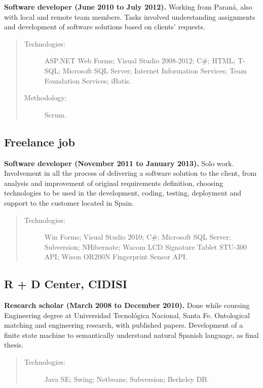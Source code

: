 \textbf{Software developer (June 2010 to July 2012).} Working from Paraná, also with local and remote team members. Tasks involved understanding assignments and development of software solutions based on clients' requests.

\begin{quote}
\begin{description}
    \item[Technologies:] ASP.NET Web Forms; Visual Studio 2008-2012; C\#; HTML; T-SQL; Microsoft SQL Server; Internet Information Services; Team Foundation Services; iBatis.
    \item[Methodology:] Scrum.
\end{description}
\end{quote}

\subsection*{Freelance job}

\textbf{Software developer (November 2011 to January 2013).} Solo work. Involvement in all the process of delivering a software solution to the client, from analysis and improvement of original requirements definition, choosing technologies to be used in the development, coding, testing, deployment and support to the customer located in Spain.

\begin{quote}
\begin{description}
    \item[Technologies:] Win Forms; Visual Studio 2010; C\#; Microsoft SQL Server; Subversion; NHibernate; Wacom LCD Signature Tablet STU-300 API; Wison OR200N Fingerprint Sensor API.
\end{description}
\end{quote}

\subsection*{R + D Center, CIDISI}

\textbf{Research scholar (March 2008 to December 2010).} Done while coursing Engineering degree at Universidad Tecnológica Nacional, Santa Fe. Ontological matching and engineering research, with published papers. Development of a finite state machine to semantically understand natural Spanish language, as final thesis.

\begin{quote}
\begin{description}
    \item[Technologies:] Java SE; Swing; Netbeans; Subversion; Berkeley DB.    
\end{description}
\end{quote}